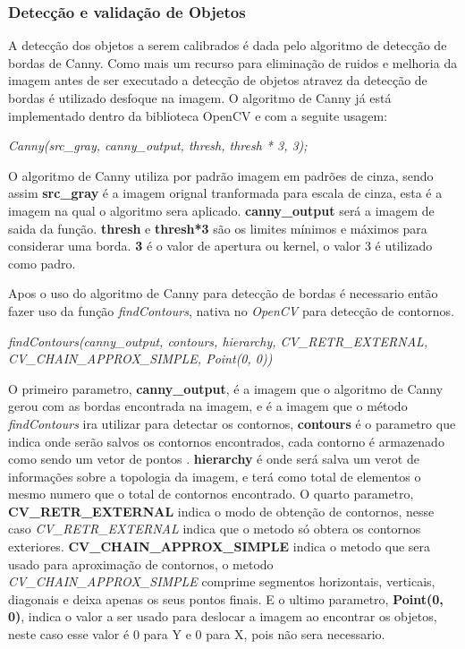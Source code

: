 \subsubsection{Detecção e validação de Objetos}
A detecção dos objetos a serem calibrados é dada pelo algoritmo de detecção de bordas de Canny. Como mais um recurso para eliminação de ruidos e melhoria da imagem antes de ser executado a detecção de objetos atravez da detecção de bordas é utilizado desfoque na imagem. O algoritmo de Canny já está implementado dentro da biblioteca OpenCV e com a seguite usagem:
\begin{center}
\centering \textit{  Canny(src\_gray, canny\_output, thresh, thresh * 3, 3);}
\end{center}
O algoritmo de Canny utiliza por padrão imagem em padrões de cinza, sendo assim \textbf{src\_gray} é a imagem orignal tranformada para escala de cinza, esta é a imagem na qual o algoritmo sera aplicado. \textbf{canny\_output} será a imagem de saida da função.
\textbf{thresh} e \textbf{thresh*3} são os limites mínimos e máximos para considerar uma borda. \textbf{3} é o valor de apertura ou kernel, o valor 3 é utilizado como padro.

Apos o uso do algoritmo de Canny para detecção de bordas é necessario então fazer uso da função \textit{findContours}, nativa no \textit{OpenCV} para detecção de contornos.
\begin{center}
\centering \textit{ findContours(canny\_output, contours, hierarchy, CV\_RETR\_EXTERNAL, CV\_CHAIN\_APPROX\_SIMPLE, Point(0, 0))}
\end{center}

O primeiro parametro, \textbf{canny\_output}, é a imagem que o algoritmo de Canny gerou com as bordas encontrada na imagem, e é a imagem que o método \textit{findContours} ira utilizar para detectar os contornos, \textbf{contours} é o parametro que indica onde serão salvos os contornos encontrados, cada contorno é armazenado como sendo um vetor de pontos \cite{OpenCV}. \textbf{hierarchy} é onde será salva um verot de informações sobre a topologia da imagem, e terá como total de elementos o mesmo numero que o total de contornos encontrado\cite{OpenCV}. O quarto parametro, \textbf{CV\_RETR\_EXTERNAL} indica o modo de obtenção de contornos, nesse caso \textit{CV\_RETR\_EXTERNAL} indica que o metodo só obtera os contornos exteriores\cite{OpenCV}. \textbf{CV\_CHAIN\_APPROX\_SIMPLE} indica o metodo que sera usado para aproximação de contornos, o metodo \textit{CV\_CHAIN\_APPROX\_SIMPLE} comprime segmentos horizontais, verticais, diagonais e deixa apenas os seus pontos finais\cite{OpenCV}. E o ultimo parametro, \textbf{Point(0, 0)}, indica o valor a ser usado para deslocar a imagem ao encontrar os objetos, neste caso esse valor é 0 para Y e 0 para X, pois não sera necessario. 

